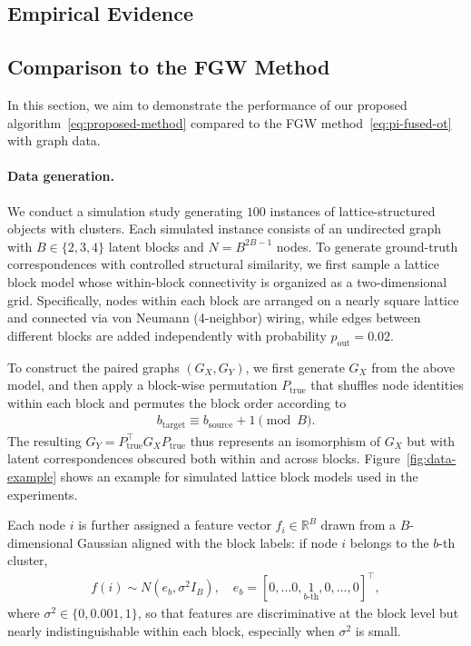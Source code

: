 \documentclass{article}
\begin{document}
\subsection{Empirical Evidence}

\subsection{Comparison to the FGW Method}
In this section, we aim to demonstrate the performance of our proposed algorithm~\eqref{eq:proposed-method} compared to the FGW method~\eqref{eq:pi-fused-ot} with graph data.

\paragraph{Data generation.}
We conduct a simulation study generating $100$ instances of lattice-structured objects with clusters. Each simulated instance consists of an undirected graph with $B \in \{2,3,4\}$ latent blocks and $N = B^{2B-1}$ nodes.
To generate ground-truth correspondences with controlled structural similarity, we first sample a lattice block model whose within-block connectivity is organized as a two-dimensional grid.
Specifically, nodes within each block are arranged on a nearly square lattice and connected via von Neumann (4-neighbor) wiring, while edges between different blocks are added independently with probability $p_{\text{out}} = 0.02$.

To construct the paired graphs $(G_X, G_Y)$, we first generate $G_X$ from the above model, and then apply a block-wise permutation $P_{\text{true}}$ that shuffles node identities within each block and permutes the block order according to
\begin{align*}
	b_{\text{target}} \equiv b_{\text{source}} + 1 \pmod B .
\end{align*}
The resulting $G_Y = P_{\text{true}}^\top G_X P_{\text{true}}$ thus represents an isomorphism of $G_X$ but with latent correspondences obscured both within and across blocks. Figure~\ref{fig:data-example} shows an example for simulated lattice block models used in the experiments.

Each node $i$ is further assigned a feature vector $f_i \in \mathbb{R}^B$ drawn from a $B$-dimensional Gaussian aligned with the block labels: if node $i$ belongs to the $b$-th cluster,
\begin{align*}
	f(i) \sim N(e_b,\sigma^2 I_B) , \quad e_b = [0,...0,\underset{\text{$b$-th}}{1},0,...,0]^\top ,
\end{align*}
where $\sigma^2 \in \{0,0.001,1\}$, so that features are discriminative at the block level but nearly indistinguishable within each block, especially when $\sigma^2$ is small.
\end{document}
